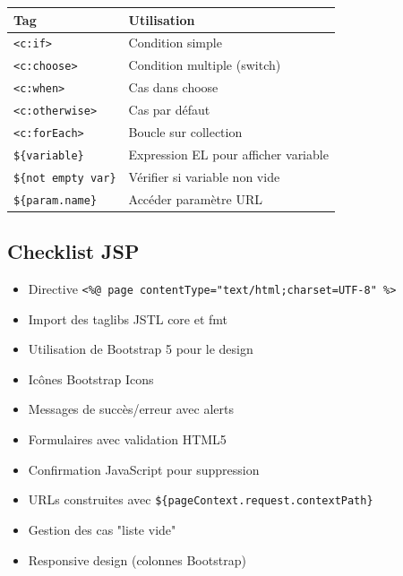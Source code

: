 \documentclass[12pt,a4paper]{article}
\begin{document}
\begin{center}
\begin{tabular}{|l|p{8cm}|}
\hline
\textbf{Tag} & \textbf{Utilisation} \\
\hline
\texttt{<c:if>} & Condition simple \\
\hline
\texttt{<c:choose>} & Condition multiple (switch) \\
\hline
\texttt{<c:when>} & Cas dans choose \\
\hline
\texttt{<c:otherwise>} & Cas par défaut \\
\hline
\texttt{<c:forEach>} & Boucle sur collection \\
\hline
\texttt{\$\{variable\}} & Expression EL pour afficher variable \\
\hline
\texttt{\$\{not empty var\}} & Vérifier si variable non vide \\
\hline
\texttt{\$\{param.name\}} & Accéder paramètre URL \\
\hline
\end{tabular}
\end{center}

\subsection{Checklist JSP}

\begin{itemize}
    \item[$\square$] Directive \texttt{<\%@ page contentType="text/html;charset=UTF-8" \%>}
    \item[$\square$] Import des taglibs JSTL core et fmt
    \item[$\square$] Utilisation de Bootstrap 5 pour le design
    \item[$\square$] Icônes Bootstrap Icons
    \item[$\square$] Messages de succès/erreur avec alerts
    \item[$\square$] Formulaires avec validation HTML5
    \item[$\square$] Confirmation JavaScript pour suppression
    \item[$\square$] URLs construites avec \texttt{\$\{pageContext.request.contextPath\}}
    \item[$\square$] Gestion des cas "liste vide"
    \item[$\square$] Responsive design (colonnes Bootstrap)
\end{itemize}

\newpage
\end{document}
